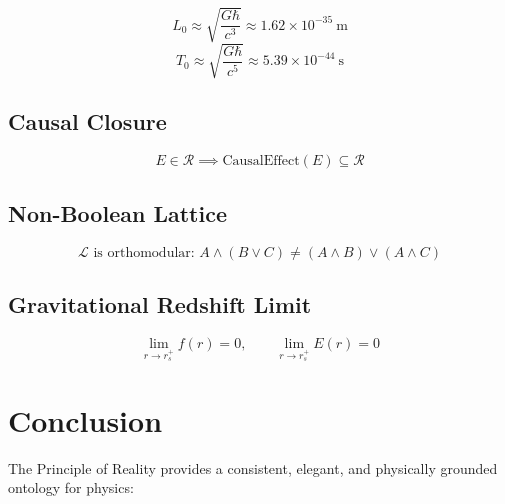 \documentclass[aps,preprint,showpacs,showkeys]{revtex4}
\begin{document}
\begin{equation}
L_0 \approx \sqrt{\frac{G\hbar}{c^3}} \approx 1.62 \times 10^{-35}\ \text{m}
\end{equation}
\begin{equation}
T_0 \approx \sqrt{\frac{G\hbar}{c^5}} \approx 5.39 \times 10^{-44}\ \text{s}
\end{equation}

\subsection{Causal Closure}

\begin{equation}
E \in \mathcal{R} \implies \text{CausalEffect}(E) \subseteq \mathcal{R}
\end{equation}

\subsection{Non-Boolean Lattice}

\begin{equation}
\mathcal{L} \text{ is orthomodular: } A \wedge (B \vee C) \neq (A \wedge B)
\vee (A \wedge C)
\end{equation}

\subsection{Gravitational Redshift Limit}

\begin{equation}
\lim_{r \to r_s^+} f(r) = 0, \qquad \lim_{r \to r_s^+} E(r) = 0
\end{equation}

\section{Conclusion}

The Principle of Reality provides a consistent, elegant, and physically
grounded ontology for physics:
\end{document}
